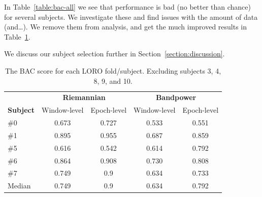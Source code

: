         In Table~\ref{table:bac-all} we see that performance is bad (no better than chance) for several subjects. We investigate these and find issues with the amount of data (and\ldots). We remove them from analysis, and get the much improved results in Table~\ref{table:bac-selective}.

        We discuss our subject selection further in Section~\ref{section:discussion}.

        \begin{table}[h]
            \centering
            \begin{tabular}{lcccc}
                \toprule
                & \multicolumn{2}{c}{\textbf{Riemannian}} & \multicolumn{2}{c}{\textbf{Bandpower}} \\
                \cmidrule(lr){2-3}
                \cmidrule(lr){4-5}
                \textbf{Subject} & Window-level & Epoch-level & Window-level & Epoch-level \\
                \midrule
                \#0 & 0.673 & 0.727 & 0.533 & 0.551 \\
                \#1 & 0.895 & 0.955 & 0.687 & 0.859 \\
                \#5 & 0.616 & 0.542 & 0.614 & 0.792 \\
                \#6 & 0.864 & 0.908 & 0.730 & 0.808 \\
                \#7 & 0.749 & 0.9   & 0.634 & 0.733 \\
                \midrule
                Median & 0.749 & 0.9 & 0.634 & 0.792 \\
                \bottomrule
            \end{tabular}
            \caption{The BAC score for each LORO fold/subject. Excluding subjects 3, 4, 8, 9, and 10.}\label{table:bac-selective}
        \end{table}

